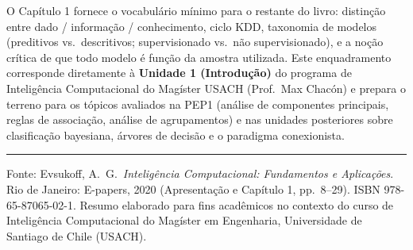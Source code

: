 \documentclass[11pt,a4paper]{article}
\begin{document}
O Capítulo 1 fornece o vocabulário mínimo para o restante do livro: distinção entre
dado / informação / conhecimento, ciclo KDD, taxonomia de modelos (preditivos vs.\
descritivos; supervisionado vs.\ não supervisionado), e a noção crítica de que todo
modelo é função da amostra utilizada. Este enquadramento corresponde diretamente à
\textbf{Unidade 1 (Introdução)} do programa de Inteligência Computacional do Magíster
USACH (Prof.\ Max Chacón) e prepara o terreno para os tópicos avaliados na PEP1
(análise de componentes principais, reglas de associação, análise de agrupamentos) e
nas unidades posteriores sobre clasificação bayesiana, árvores de decisão e o
paradigma conexionista.

\vspace{0.4em}
\hrule
\vspace{0.3em}
{\footnotesize Fonte: Evsukoff, A.\ G.\ \emph{Inteligência Computacional: Fundamentos e
Aplicações}. Rio de Janeiro: E-papers, 2020 (Apresentação e Capítulo 1, pp.\ 8--29).
ISBN 978-65-87065-02-1. Resumo elaborado para fins acadêmicos no contexto do curso de
Inteligência Computacional do Magíster em Engenharia, Universidade de Santiago de
Chile (USACH).}
\end{document}
